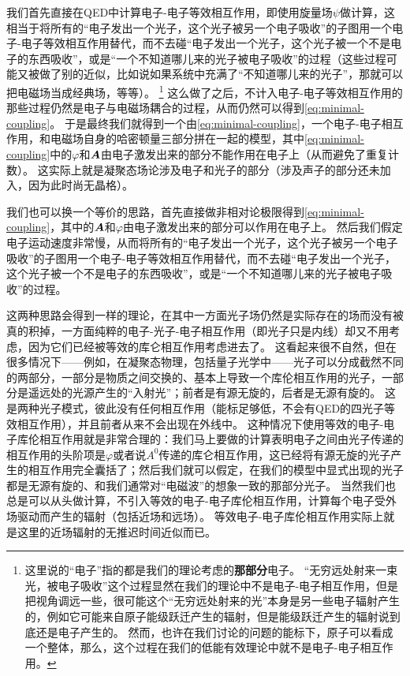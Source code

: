 \documentclass[hyperref, UTF8, a4paper]{ctexart}
\renewcommand{\emph}{\textbf}
\begin{document}
我们首先直接在QED中计算电子-电子等效相互作用，即使用旋量场$\psi$做计算，这相当于将所有的“电子发出一个光子，这个光子被另一个电子吸收”的子图用一个电子-电子等效相互作用替代，而不去碰“电子发出一个光子，这个光子被一个不是电子的东西吸收”，或是“一个不知道哪儿来的光子被电子吸收”的过程（这些过程可能又被做了别的近似，比如说如果系统中充满了“不知道哪儿来的光子”，那就可以把电磁场当成经典场，等等）。%
\footnote{
    这里说的“电子”指的都是我们的理论考虑的\emph{那部分}电子。
    “无穷远处射来一束光，被电子吸收”这个过程显然在我们的理论中不是电子-电子相互作用，但是把视角调远一些，很可能这个“无穷远处射来的光”本身是另一些电子辐射产生的，例如它可能来自原子能级跃迁产生的辐射，但是能级跃迁产生的辐射说到底还是电子产生的。
    然而，也许在我们讨论的问题的能标下，原子可以看成一个整体，那么，这个过程在我们的低能有效理论中就不是电子-电子相互作用。
}%
这么做了之后，不计入电子-电子等效相互作用的那些过程仍然是电子与电磁场耦合的过程，从而仍然可以得到\eqref{eq:minimal-coupling}。
于是最终我们就得到一个由\eqref{eq:minimal-coupling}，一个电子-电子相互作用，和电磁场自身的哈密顿量三部分拼在一起的模型，其中\eqref{eq:minimal-coupling}中的$\varphi$和$\vb*{A}$由电子激发出来的部分不能作用在电子上（从而避免了重复计数）。
这实际上就是凝聚态场论涉及电子和光子的部分（涉及声子的部分还未加入，因为此时尚无晶格）。

我们也可以换一个等价的思路，首先直接做非相对论极限得到\eqref{eq:minimal-coupling}，其中的$\vb*{A}$和$\varphi$由电子激发出来的部分可以作用在电子上。
然后我们假定电子运动速度非常慢，从而将所有的“电子发出一个光子，这个光子被另一个电子吸收”的子图用一个电子-电子等效相互作用替代，而不去碰“电子发出一个光子，这个光子被一个不是电子的东西吸收”，或是“一个不知道哪儿来的光子被电子吸收”的过程。

这两种思路会得到一样的理论，在其中一方面光子场仍然是实际存在的场而没有被真的积掉，一方面纯粹的电子-光子-电子相互作用（即光子只是内线）却又不用考虑，因为它们已经被等效的库仑相互作用考虑进去了。
这看起来很不自然，但在很多情况下——例如，在凝聚态物理，包括量子光学中——光子可以分成截然不同的两部分，一部分是物质之间交换的、基本上导致一个库伦相互作用的光子，一部分是遥远处的光源产生的“入射光”；前者是有源无旋的，后者是无源有旋的。
这是两种光子模式，彼此没有任何相互作用（能标足够低，不会有QED的四光子等效相互作用），并且前者从来不会出现在外线中。
这种情况下使用等效的电子-电子库伦相互作用就是非常合理的：我们马上要做的计算表明电子之间由光子传递的相互作用的头阶项是$\varphi$或者说$A^0$传递的库仑相互作用，这已经将有源无旋的光子产生的相互作用完全囊括了；然后我们就可以假定，在我们的模型中显式出现的光子都是无源有旋的、和我们通常对“电磁波”的想象一致的那部分光子。
当然我们也总是可以从头做计算，不引入等效的电子-电子库伦相互作用，计算每个电子受外场驱动而产生的辐射（包括近场和远场）。
等效电子-电子库伦相互作用实际上就是这里的近场辐射的无推迟时间近似而已。
\end{document}
